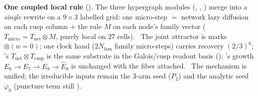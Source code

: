 \documentclass[11pt,a4paper]{article}
\newcommand{\phiz}{\varphi_0}
\newcommand{\Nfam}{N_{\mathrm{fam}}}
\begin{document}
\par\smallskip\noindent\textbf{One coupled local rule}
(). The three hypergraph modules (,
, ) merge
into a \emph{single} rewrite on a $9{\times}3$ labelled grid: one micro-step $=$ network lazy diffusion on each
cusp column $+$ the  rule $M$ on each node's family vector ($T_{\mathrm{micro}}{=}T_{\mathrm{net}}\otimes
M$, purely local on $27$ cells). \mE\ The joint attractor is marks$\otimes(w{=}0)$; one clock hand ($2\Nfam$ family
micro-steps) carries recovery $(2/3)^6$; 's $T_{\mathrm{net}}\otimes T_{\mathrm{cusp}}$ is the same
substrate in the Galois/cusp readout basis (); 's growth $E_6{\to}E_7{\to}E_8{\to}\hat E_8$ is
unchanged with the fiber attached. \mO\ The mechanism is unified; the irreducible inputs remain the $3$-arm seed
($P_2$) and the analytic seed $\phiz$ (puncture term still ).
\end{document}
